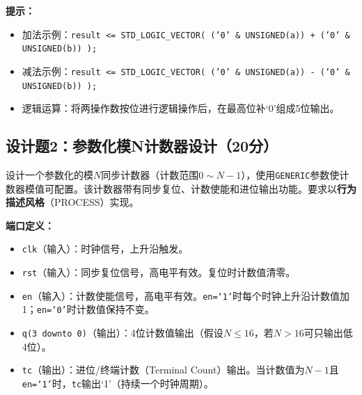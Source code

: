 \begin{framed}
\textbf{提示：}
\begin{itemize}
  \item 加法示例：\texttt{result <= STD\_LOGIC\_VECTOR( ('0' \& UNSIGNED(a)) + ('0' \& UNSIGNED(b)) );}
  \item 减法示例：\texttt{result <= STD\_LOGIC\_VECTOR( ('0' \& UNSIGNED(a)) - ('0' \& UNSIGNED(b)) );}
  \item 逻辑运算：将两操作数按位进行逻辑操作后，在最高位补`0'组成5位输出。
\end{itemize}
\end{framed}

\newpage

\subsection*{设计题2：参数化模N计数器设计（20分）}

设计一个参数化的模$N$同步计数器（计数范围$0 \sim N-1$），使用\texttt{GENERIC}参数使计数器模值可配置。该计数器带有同步复位、计数使能和进位输出功能。要求以\textbf{行为描述风格}（PROCESS）实现。

\vspace{0.3cm}

\textbf{端口定义：}
\begin{itemize}
  \item \texttt{clk}（输入）：时钟信号，上升沿触发。
  \item \texttt{rst}（输入）：同步复位信号，高电平有效。复位时计数值清零。
  \item \texttt{en}（输入）：计数使能信号，高电平有效。\texttt{en=`1'}时每个时钟上升沿计数值加1；\texttt{en=`0'}时计数值保持不变。
  \item \texttt{q(3~downto~0)}（输出）：4位计数值输出（假设$N \le 16$，若$N>16$可只输出低4位）。
  \item \texttt{tc}（输出）：进位/终端计数（Terminal Count）输出。当计数值为$N-1$且\texttt{en=`1'}时，\texttt{tc}输出`1'（持续一个时钟周期）。
\end{itemize}

\vspace{0.3cm}

